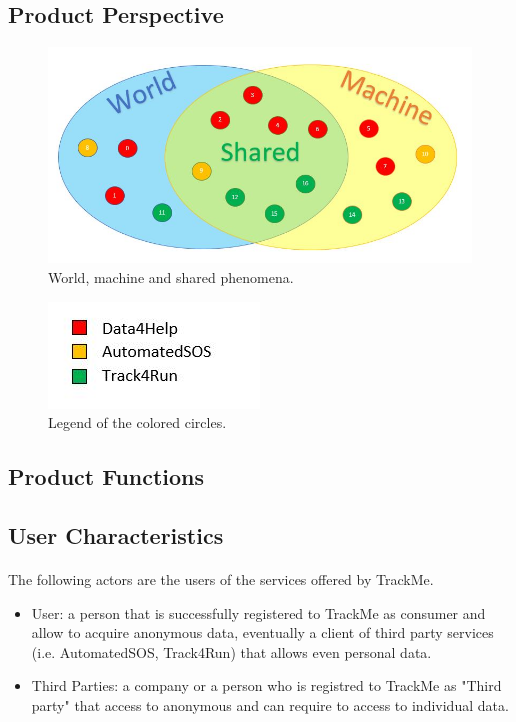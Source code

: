 \documentclass[a4paper]{article}
\begin{document}
\subsection{Product Perspective}

\begin{figure}[h!]
    \centering
    \includegraphics[width=\linewidth]{phenomenaSets}
    \caption{World, machine and shared phenomena.}
    \label{fig:my_label}
\end{figure}

\begin{figure}[h!]
    \centering
    \includegraphics{setsLegend}
    \caption{Legend of the colored circles.}
    \label{fig:my_label}
\end{figure}


\subsection{Product Functions}

\subsection{User Characteristics}

\paragraph{}The following actors are the users of the services offered by TrackMe. 


\begin{itemize}
    \item User:  a person that is successfully registered to TrackMe as consumer and allow to acquire anonymous data, eventually a client of third party services (i.e. AutomatedSOS, Track4Run) that allows even personal data.
    
    \item Third Parties:  a company or a person who is registred to TrackMe as "Third party" that access to anonymous and can require to access to individual data.
    
\end{itemize}
\end{document}
